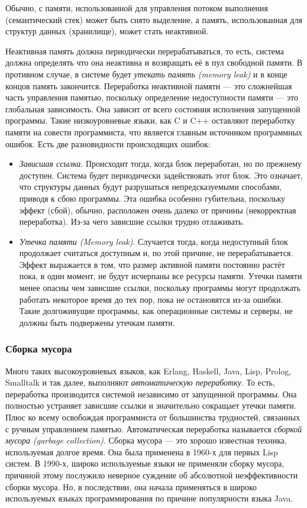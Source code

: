 Обычно, с памяти, использованной для управления потоком выполнения (семантический стек) может быть снято выделение, а память, использованная для структур данных (хранилище), может стать неактивной.

Неактивная память должна периодически перерабатываться, то есть, система должна определять что она неактивна и возвращать её в пул свободной памяти. В противном случае, в системе будет \emph{утекать память (memory leak)} и в конце концов память закончится. Переработка неактивной памяти --- это сложнейшая часть управления памятью, поскольку определение недоступности памяти --- это глобальная зависимость. Она зависит от всего состояния исполнения запущенной программы. Такие низкоуровневые языки, как C и C++ оставляют переработку памяти на совести программиста, что является главным источником программных ошибок. Есть две разновидности происходящих ошибок:

\begin{itemize}
\item{\emph{Зависшая ссылка}. Происходит тогда, когда блок переработан, но по прежнему доступен. Система будет периодически задействовать этот блок. Это означает, что структуры данных будут разрушаться непредсказуемыми способами, приводя к сбою программы. Эта ошибка особенно губительна, поскольку эффект (сбой), обычно, расположен очень далеко от причины (некорректная переработка). Из-за чего зависшие ссылки трудно отлаживать.}

\item{\emph{Утечка памяти (Memory leak)}. Случается тогда, когда недоступный блок продолжает считаться доступным и, по этой причине, не перерабатывается. Эффект выражается в том, что размер активной памяти постоянно растёт пока, в один момент, не будут исчерпаны все ресурсы памяти. Утечки памяти менее опасны чем зависшие ссылки, поскольку программы могут продолжать работать некоторое время до тех пор, пока не остановятся из-за ошибки. Такие долгоживущие программы, как операционные системы и серверы, не должны быть подвержены утечкам памяти.}
\end{itemize}

\subsubsection{Сборка мусора}

Много таких высокоуровневых языков, как Erlang, Haskell, Java, Lisp, Prolog, Smalltalk и так далее, выполняют \emph{автоматическую переработку}. То есть, переработка производится системой независимо от запущенной программы. Она полностью устраняет зависшие ссылки и значительно сокращает утечки памяти. Плюс ко всему освобождая программиста от большинства трудностей, связанных с ручным управлением памятью. Автоматическая переработка называется \emph{сборкой мусора (garbage collection)}. Сборка мусора --- это хорошо известная техника, используемая долгое время. Она была применена в 1960-х для первых Lisp систем. В 1990-х, широко используемые языки не применяли сборку мусора, причиной этому послужило неверное суждение об абсолютной неэффективности сборки мусора. Но, в последствии, она начала применяться в широко используемых языках программирования по причине популярности языка Java.

